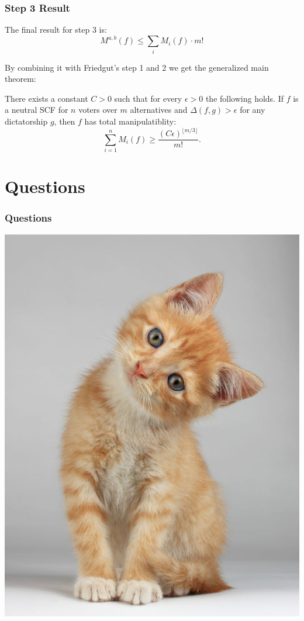 \documentclass[aspectratio=169]{beamer}
\begin{document}
		\begin{frame}
			\frametitle{Step 3 Result}

			The final result for step 3 is:
			\[
				M^{a,b}(f) \le \sum_i M_i(f) \cdot m!
			\]

			By combining it with Friedgut's step 1 and 2 we get the generalized main theorem:
			\begin{theorem}
				There exists a constant $C > 0$ such that for every $\epsilon > 0$ the following holds. If $f$ is a neutral SCF for $n$ voters over $m$ alternatives and $\Delta(f, g) > \epsilon$ for any dictatorship $g$, then $f$ has total manipulatiblity:
				\[
					\sum^n_{i=1} M_i(f) \ge \frac{(C\epsilon)^{\lfloor m/3 \rfloor}}{m!}.
				\]
			\end{theorem}

		\end{frame}


	\section{Questions}

		\begin{frame}
			\frametitle{Questions}

			\vspace*{-0.12cm}
			\centerline{\includegraphics[height=0.85\paperheight, keepaspectratio]{../figures/question_kitten.jpg}}
		\end{frame}
\end{document}

